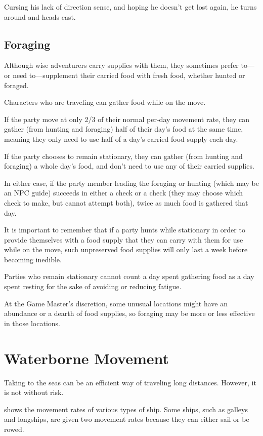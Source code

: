 \begin{multicols*}{2}
{Cursing his lack of direction sense, and hoping he doesn’t get lost again, he turns around and heads east.}

\subsection{Foraging}
Although wise adventurers carry supplies with them, they sometimes prefer to—or need to—supplement their carried food with fresh food, whether hunted or foraged.

Characters who are traveling can gather food while on the move.

If the party move at only 2/3 of their normal per-day movement rate, they can gather (from hunting and foraging) half of their day’s food at the same time, meaning they only need to use half of a day’s carried food supply each day.

If the party chooses to remain stationary, they can gather (from hunting and foraging) a whole day’s food, and don’t need to use any of their carried supplies.

In either case, if the party member leading the foraging or hunting (which may be an NPC guide) succeeds in either a  check or a  check (they may choose which check to make, but cannot attempt both), twice as much food is gathered that day.

It is important to remember that if a party hunts while stationary in order to provide themselves with a food supply that they can carry with them for use while on the move, such unpreserved food supplies will only last a week before becoming inedible.

Parties who remain stationary cannot count a day spent gathering food as a day spent resting for the sake of avoiding or reducing fatigue.

At the Game Master’s discretion, some unusual locations might have an abundance or a dearth of food supplies, so foraging may be more or less effective in those locations.

\section{Waterborne Movement}\label{sec:Waterborne Movement}
Taking to the seas can be an efficient way of traveling long distances. However, it is not without risk.

 shows the movement rates of various types of ship. Some ships, such as galleys and longships, are given two movement rates because they can either sail or be rowed.


\end{multicols*}

